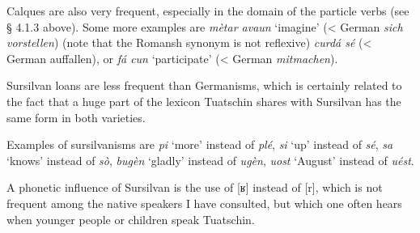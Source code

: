Calques are also very frequent, especially in the domain of the particle verbs (see § 4.1.3 above). Some more examples are \textit{mètar avaun} `imagine' (< German \textit{sich vorstellen}) (note that the Romansh synonym is not reflexive) \textit{curdá sé} (< German auffallen), or \textit{fá cun} `participate' (< German \textit{mitmachen}).

Sursilvan loans are less frequent than Germanisms, which is certainly related to the fact that a huge part of the lexicon Tuatschin shares with Sursilvan has the same form in both varieties.

Examples of sursilvanisms are \textit{pi} `more' instead of \textit{plé}, \textit{si} `up' instead of \textit{sé}, \textit{sa} `knows' instead of \textit{sò}, \textit{bugèn} `gladly' instead of \textit{ugèn}, \textit{uost} `August' instead of \textit{uést}.

A phonetic influence of Sursilvan is the use of [ʁ] instead of [r], which is not frequent among the native speakers I have consulted, but which one often hears when younger people or children speak Tuatschin.

